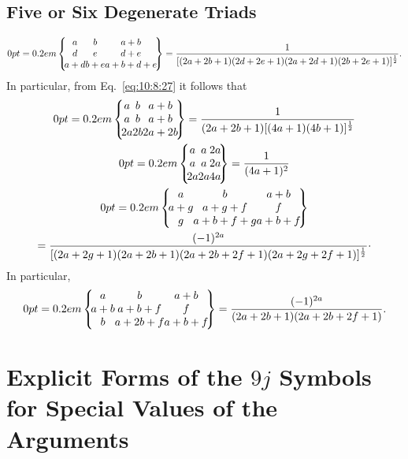 \subsection{Five or Six Degenerate Triads}\label{sec:10.8.6}
\begin{equation}
\ninej{a}{b}{a+b  \label{eq:10:8:27}}{d}{e}{d+e}{a+d}{b+e}{a+b+d+e}=\frac{1}{[(2 a+2 b+1)(2 d+2 e+1)(2 a+2 d+1)(2 b+2 e+1)]^{\frac{1}{2}}} .
\end{equation}
In particular, from Eq.~\eqref{eq:10:8:27} it follows that
\begin{gather}
\ninej{a}{b}{a+b}{a}{b}{a+b}{2 a}{2 b}{2 a+2 b}=\frac{1}{(2 a+2 b+1)[(4 a+1)(4 b+1)]^{\frac{1}{2}}}  \label{eq:10:8:28}\\
\ninej{a}{a}{2 a}{a}{a}{2 a}{2 a}{2 a}{4 a}=\frac{1}{(4 a+1)^{2}}  \label{eq:10:8:29}\\
\ninej{a}{b}{a+b}{a+g}{a+g+f}{f}{g}{a+b+f+g}{a+b+f}  \notag\\
=\frac{(-1)^{2 a}}{[(2 a+2 g+1)(2 a+2 b+1)(2 a+2 b+2 f+1)(2 a+2 g+2 f+1)]^{\frac{1}{2}}} \cdot \label{eq:10:8:30}
\end{gather}
In particular,
\begin{equation}
\ninej{a}{b}{a+b  \label{eq:10:8:31}}{a+b}{a+b+f}{f}{b}{a+2 b+f}{a+b+f}=\frac{(-1)^{2 a}}{(2 a+2 b+1)(2 a+2 b+2 f+1)} .
\end{equation}
\section{Explicit Forms of the $9 j$ Symbols for Special Values of the Arguments}\label{sec:10.9}
